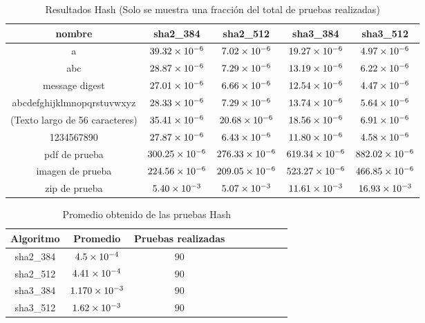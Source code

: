 \documentclass[../main.tex]{subfiles}
\begin{document}
\begin{table}[ht]
  \centering
  \caption{Resultados Hash (Solo se muestra una fracción del total de pruebas realizadas)}\label{tab:hash-res}
  \begin{tabular}{|c|c|c|c|c|}
    \hline
    \rowcolor[HTML]{000000}
    {\color[HTML]{FFFFFF} nombre} & {\color[HTML]{FFFFFF} sha2\_384} & {\color[HTML]{FFFFFF} sha2\_512} & {\color[HTML]{FFFFFF} sha3\_384} & {\color[HTML]{FFFFFF} sha3\_512} \\ \hline
    a                          & $\num{39.32E-06}$  & $\num{7.02E-06 }$  & $\num{19.27E-06}$  & $\num{4.97E-06}$   \\ \hline
    \rowcolor[HTML]{C0C0C0}
    abc                        & $\num{28.87E-06}$  & $\num{7.29E-06 }$  & $\num{13.19E-06}$  & $\num{6.22E-06}$   \\ \hline
    message digest             & $\num{27.01E-06}$  & $\num{6.66E-06 }$  & $\num{12.54E-06}$  & $\num{4.47E-06}$   \\ \hline
    \rowcolor[HTML]{C0C0C0}
    abcdefghijklmnopqrstuvwxyz & $\num{28.33E-06}$  & $\num{7.29E-06 }$  & $\num{13.74E-06}$  & $\num{5.64E-06}$   \\ \hline
    (Texto largo de 56 caracteres)              & $\num{35.41E-06}$  & $\num{20.68E-06}$  & $\num{18.56E-06}$  & $\num{6.91E-06}$   \\ \hline
    \rowcolor[HTML]{C0C0C0}
    1234567890                 & $\num{27.87E-06}$  & $\num{6.43E-06 }$  & $\num{11.80E-06}$  & $\num{4.58E-06}$   \\ \hline
    pdf de prueba              & $\num{300.25E-06}$ & $\num{276.33E-06}$ & $\num{619.34E-06}$ & $\num{882.02E-06}$ \\ \hline
    \rowcolor[HTML]{C0C0C0}
    imagen de prueba           & $\num{224.56E-06}$ & $\num{209.05E-06}$ & $\num{523.27E-06}$ & $\num{466.85E-06}$ \\ \hline
    zip de prueba              & $\num{5.40E-03 }$  & $\num{5.07E-03 }$  & $\num{11.61E-03}$  & $\num{16.93E-03}$  \\ \hline
  \end{tabular}
\end{table}

\begin{table}[ht]
  \scriptsize
  \centering
  \caption{Promedio obtenido de las pruebas Hash}\label{tab:hash-res-prom}
  \begin{tabular}{|c|c|c|c|c|c|c|c|c|}
    \hline
    \rowcolor[HTML]{000000}
    {\color[HTML]{FFFFFF} Algoritmo} &
  {\color[HTML]{FFFFFF} Promedio} &
  {\color[HTML]{FFFFFF} Pruebas realizadas} \\ \hline
    sha2\_384  & $\num{4.5E-04}$ & $\num{90}$ \\ \hline
    \rowcolor[HTML]{C0C0C0}
    sha2\_512 & $\num{4.41E-04}$ & $\num{90}$ \\ \hline
    sha3\_384 & $\num{1.170E-03}$ & $\num{90}$ \\ \hline
    \rowcolor[HTML]{C0C0C0}
    sha3\_512 & $\num{1.62E-03}$ & $\num{90}$ \\ \hline
  \end{tabular}
\end{table}
\end{document}
